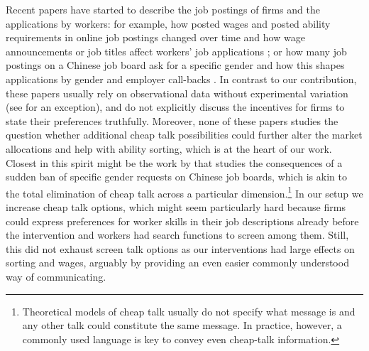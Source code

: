\documentclass[12pt]{article}
\begin{document}
Recent papers have started to describe the job postings of firms and the applications by workers: for example, how posted wages and posted ability requirements in online job postings changed over time \citep{choi2020wage} and how wage announcements or job titles affect workers' job applications \citep{banfi2019high, belot2022wage, marinescu2020opening}; or how many job postings on a Chinese job board ask for a specific gender \citep{kuhn2013gender} and how this shapes applications by gender and employer call-backs \citep{kuhn2020gender}. In contrast to our contribution, these papers usually rely on observational data without experimental variation (see \cite{belot2022wage} for an exception), and do not explicitly discuss the incentives for firms to state their preferences truthfully. Moreover, none of these papers studies the question whether additional cheap talk possibilities could further alter the market allocations and help with ability sorting, which is at the heart of our work. Closest in this spirit might be the work by \cite{kuhn2023happens} that studies the consequences of a sudden ban of specific gender requests on Chinese job boards, which is akin to the total elimination of cheap talk across a particular dimension.\footnote{Theoretical models of cheap talk usually do not specify what message is and any other talk could constitute the same message. In practice, however, a commonly used language is key to convey even cheap-talk information.} In our setup we increase cheap talk options, which might seem particularly hard because firms could express preferences for worker skills in their job descriptions already before the intervention and workers had search functions to screen among them. Still, this did not exhaust screen talk options as our interventions had large effects on sorting and wages, arguably by providing an even easier commonly understood way of communicating. 
\end{document}
